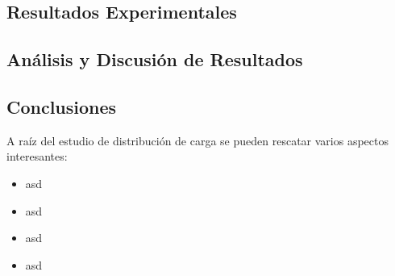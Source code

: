 \subsection{Resultados Experimentales}

\subsection{Análisis y Discusión de Resultados}

\subsection{Conclusiones}
A raíz del estudio de distribución de carga se pueden rescatar varios aspectos interesantes:
\begin{itemize}
\item asd
\item asd
\item asd
\item asd
\end{itemize}

